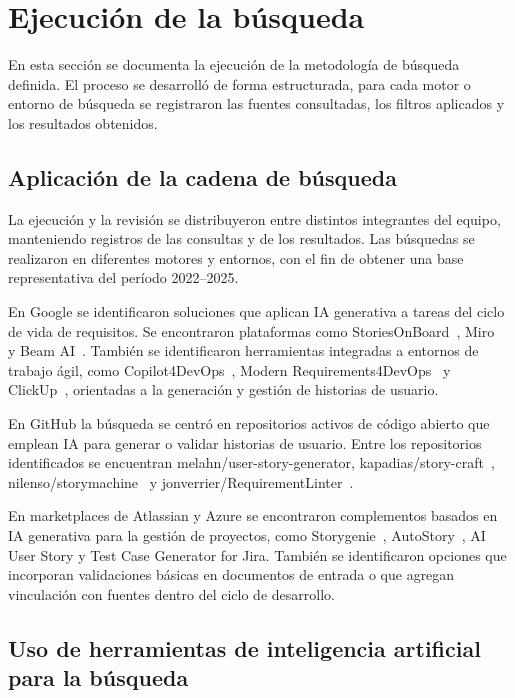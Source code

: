 \section{Ejecución de la búsqueda}
En esta sección se documenta la ejecución de la metodología de búsqueda definida. El proceso se desarrolló de forma estructurada, para cada motor o entorno de búsqueda se registraron las fuentes consultadas, los filtros aplicados y los resultados obtenidos.

\subsection{Aplicación de la cadena de búsqueda}

La ejecución y la revisión se distribuyeron entre distintos integrantes del equipo, manteniendo registros de las consultas y de los resultados. Las búsquedas se realizaron en diferentes motores y entornos, con el fin de obtener una base representativa del período 2022--2025.

En Google se identificaron soluciones que aplican IA generativa a tareas del ciclo de vida de requisitos. Se encontraron plataformas como StoriesOnBoard~\cite{storiesonboard}, Miro~\cite{miroai} y Beam AI~\cite{beamai}. También se identificaron herramientas integradas a entornos de trabajo ágil, como Copilot4DevOps~\cite{copilotfordevops1}, Modern Requirements4DevOps~\cite{modernreq1} y ClickUp~\cite{clickup}, orientadas a la generación y gestión de historias de usuario.

En GitHub la búsqueda se centró en repositorios activos de código abierto que emplean IA para generar o validar historias de usuario. Entre los repositorios identificados se encuentran melahn/user-story-generator, kapadias/story-craft~\cite{storycraft}, nilenso/storymachine~\cite{storymachine} y jonverrier/RequirementLinter~\cite{requirementlinter}.

En marketplaces de Atlassian y Azure se encontraron complementos basados en IA generativa para la gestión de proyectos, como Storygenie~\cite{storygenie}, AutoStory~\cite{autostory}, AI User Story y Test Case Generator for Jira. También se identificaron opciones que incorporan validaciones básicas en documentos de entrada o que agregan vinculación con fuentes dentro del ciclo de desarrollo.

\subsection{Uso de herramientas de inteligencia artificial para la búsqueda}

